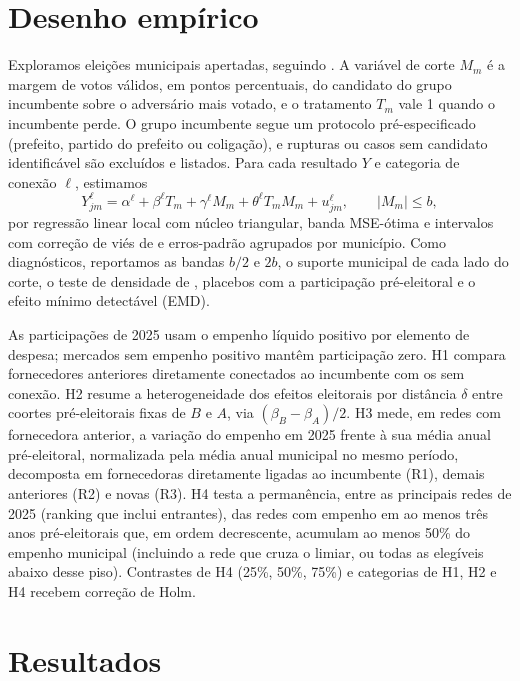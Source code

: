 \documentclass[11pt,a4paper]{article}
\begin{document}
\section{Desenho empírico}
Exploramos eleições municipais apertadas, seguindo . A variável de
corte $M_m$ é a margem de votos válidos, em pontos percentuais, do candidato do grupo
incumbente sobre o adversário mais votado, e o tratamento $T_m$ vale 1 quando o incumbente
perde. O grupo incumbente segue um protocolo pré-especificado (prefeito, partido do prefeito
ou coligação), e rupturas ou casos sem candidato identificável são excluídos e listados. Para
cada resultado $Y$ e categoria de conexão $\ell$, estimamos
\begin{equation}
  Y_{jm}^{\ell} = \alpha^{\ell} + \beta^{\ell} T_m + \gamma^{\ell} M_m + \theta^{\ell} T_m M_m + u_{jm}^{\ell},
  \qquad |M_m| \le b,
\end{equation}
por regressão linear local com núcleo triangular, banda MSE-ótima e intervalos com correção de
viés de  e erros-padrão agrupados por município. Como diagnósticos,
reportamos as bandas $b/2$ e $2b$, o suporte municipal de cada lado do corte, o teste de
densidade de , placebos com a participação pré-eleitoral e o efeito
mínimo detectável (EMD).

As participações de 2025 usam o empenho líquido positivo por elemento de despesa; mercados sem
empenho positivo mantêm participação zero. H1 compara fornecedores anteriores diretamente
conectados ao incumbente com os sem conexão. H2 resume a heterogeneidade dos efeitos eleitorais
por distância $\delta$ entre coortes pré-eleitorais fixas de $B$ e $A$, via $(\beta_B-\beta_A)/2$.
H3 mede, em redes com fornecedora anterior, a variação do empenho em 2025 frente à sua média
anual pré-eleitoral, normalizada pela média anual municipal no mesmo período, decomposta em
fornecedoras diretamente ligadas ao incumbente (R1), demais anteriores (R2) e novas (R3). H4
testa a permanência, entre as principais redes de 2025 (ranking que inclui entrantes), das
redes com empenho em ao menos três anos pré-eleitorais que, em ordem decrescente, acumulam ao
menos 50\% do empenho municipal (incluindo a rede que cruza o limiar, ou todas as elegíveis
abaixo desse piso). Contrastes de H4 (25\%, 50\%, 75\%) e categorias de H1, H2 e H4 recebem
correção de Holm.

\section{Resultados}
\leituraResultados
\end{document}
